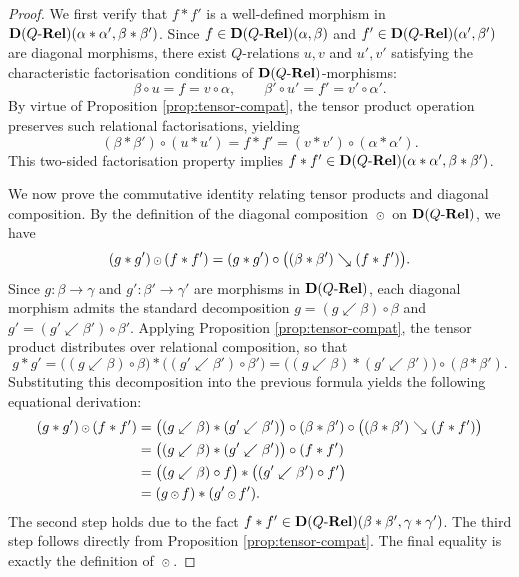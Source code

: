 \documentclass{tac}
\begin{document}
\begin{proof}
We first verify that \(f\ast f'\) is a well-defined morphism in \({\mathbf{D}(Q\text{-}\mathbf{Rel})}(\alpha\ast\alpha',\beta\ast\beta')\). Since \(f\in{\mathbf{D}(Q\text{-}\mathbf{Rel})}(\alpha,\beta)\) and \(f'\in{\mathbf{D}(Q\text{-}\mathbf{Rel})}(\alpha',\beta')\) are diagonal morphisms, there exist \(Q\)-relations \(u,v\) and \(u',v'\) satisfying the characteristic factorisation conditions of \({\mathbf{D}(Q\text{-}\mathbf{Rel})}\)-morphisms:
    \[
    \beta\circ u=f=v\circ\alpha,\qquad \beta'\circ u'=f'=v'\circ\alpha'.
    \]
By virtue of Proposition \ref{prop:tensor-compat}, the tensor product operation preserves such relational factorisations, yielding
    \[
    (\beta\ast\beta')\circ(u\ast u')=f\ast f'=(v\ast v')\circ(\alpha\ast\alpha').
    \]
This two-sided factorisation property implies \(f\ast f'\in{\mathbf{D}(Q\text{-}\mathbf{Rel})}(\alpha\ast\alpha',\beta\ast\beta')\).
    
We now prove the commutative identity relating tensor products and diagonal composition. By the definition of the diagonal composition \({\,{\scriptstyle\odot}\,}\) on \({\mathbf{D}(Q\text{-}\mathbf{Rel})}\), we have
    \[
    (g\ast g'){\,{\scriptstyle\odot}\,} (f\ast f')=(g\ast g')\circ\bigl((\beta\ast\beta')\searrow (f\ast f')\bigr).
    \]
    Since \(g\colon\beta\to\gamma\) and \(g'\colon\beta'\to\gamma'\) are morphisms in \({\mathbf{D}(Q\text{-}\mathbf{Rel})}\), each diagonal morphism admits the standard decomposition \(g=(g\swarrow\beta)\circ\beta\) and \(g'=(g'\swarrow\beta')\circ\beta'\). Applying Proposition \ref{prop:tensor-compat}, the tensor product distributes over relational composition, so that
    \[
    g\ast g'=\big((g\swarrow\beta)\circ\beta\big)\ast\big((g'\swarrow\beta')\circ\beta'\big)=\big((g\swarrow\beta)\ast(g'\swarrow\beta')\big)\circ(\beta\ast\beta').
    \]
    Substituting this decomposition into the previous formula yields the following equational derivation:
    \begin{align*}
    (g\ast g')\odt (f\ast f')
    &=\big((g\swarrow\beta)\ast(g'\swarrow\beta')\big)\circ(\beta\ast\beta')\circ\bigl((\beta\ast\beta')\searrow (f\ast f')\bigr)\\
    &=\big((g\swarrow\beta)\ast(g'\swarrow\beta')\big)\circ(f\ast f')  \\
    &=\big((g\swarrow\beta)\circ f\big)\ast\big((g'\swarrow\beta')\circ f'\big)\\
    &=(g\odt f)\ast(g'\odt f').
    \end{align*}
The second step holds due to the fact $f\ast f'\in{\mathbf{D}(Q\text{-}\mathbf{Rel})}(\beta\ast\beta',\gamma\ast\gamma')$.   The third step follows directly from Proposition \ref{prop:tensor-compat}. The final equality is exactly the definition of ${\,{\scriptstyle\odot}\,}$.
\end{proof}
  
\end{document}
